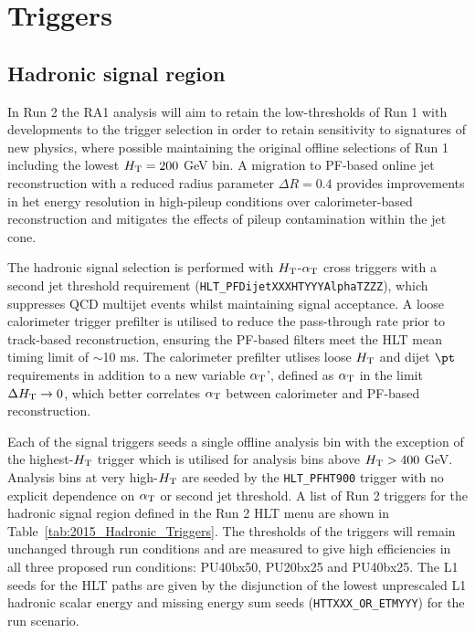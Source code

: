 \section{Triggers}
\label{sec:triggers}


\subsection{Hadronic signal region}


In Run 2 the RA1 analysis will aim to retain the low-thresholds of Run 1 with developments to the trigger selection in order to retain sensitivity to signatures of new physics, where possible maintaining the original offline selections of Run 1 including the lowest $\mbox{$H_\text{T}$} = 200$ GeV bin. A migration to PF-based online jet reconstruction with a reduced radius parameter $\Delta R = 0.4$ provides improvements in het energy resolution in high-pileup conditions over calorimeter-based reconstruction and mitigates the effects of pileup contamination within the jet cone.

The hadronic signal selection is performed with $\mbox{$H_\text{T}$}$-$\alpha_{\text{T}}$ cross triggers with a second jet threshold requirement (\verb!HLT_PFDijetXXXHTYYYAlphaTZZZ!), which suppresses QCD multijet events whilst maintaining signal acceptance.  A loose calorimeter trigger prefilter is utilised to reduce the pass-through rate prior to track-based reconstruction, ensuring the PF-based filters meet the HLT mean timing limit of $\sim$10 ms. The calorimeter prefilter utlises loose $\mbox{$H_\text{T}$}$ and dijet $\pt$ requirements in addition to a new variable $\alpha_{\text{T}}$', defined as $\alpha_{\text{T}}$ in the limit $\Delta\mbox{$H_\text{T}$} \rightarrow 0$, which better correlates $\alpha_{\text{T}}$ between calorimeter and PF-based reconstruction.

Each of the signal triggers seeds a single offline analysis bin with the exception of the highest-$\mbox{$H_\text{T}$}$ trigger which is utilised for analysis bins above $\mbox{$H_\text{T}$} > 400$ GeV. Analysis bins at very high-$\mbox{$H_\text{T}$}$ are seeded by the \verb!HLT_PFHT900! trigger with no explicit dependence on $\alpha_{\text{T}}$ or second jet threshold. A list of Run 2 triggers for the hadronic signal region defined in the Run 2 HLT menu are shown in Table~\ref{tab:2015_Hadronic_Triggers}. The thresholds of the triggers will remain unchanged through run conditions and are measured to give high efficiencies in all three proposed run conditions: PU40bx50, PU20bx25 and PU40bx25. The L1 seeds for the HLT paths are given by the disjunction of the lowest unprescaled L1 hadronic scalar energy and missing energy sum seeds (\verb!HTTXXX_OR_ETMYYY!) for the run scenario.


